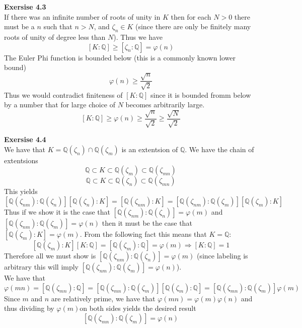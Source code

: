 \documentclass[12pt]{article}
\newenvironment{ques}[1]{\textbf{Exersise #1}\vspace{1 mm}\\ }{\bigskip}
\theoremstyle{definition}
\newcommand{\Q}{\mathbb Q}
\begin{document}
\begin{ques}{4.3}
	If there was an infinite number of roots of unity in $K$ then for each $N >
	0$ there must be a $n$ such that $n > N$, and $\zeta_n \in K$ (since there
	are only be finitely many roots of unity of degree less than $N$). Thus we have
	$$[K:\Q] \geq [\zeta_n:\Q] = \varphi(n)$$
	The Euler Phi function is bounded below (this is a commonly known lower bound)
	$$\varphi(n) \geq \frac{\sqrt n }{\sqrt 2}$$
	Thus we would contradict finiteness of $[K:\Q]$ since it is bounded fromm
	below by a number that for large choice of $N$ becomes arbitrarily large.
	$$[K:\Q] \geq \varphi(n) \geq \frac{\sqrt{n}}{\sqrt 2}
	\geq\frac{\sqrt{N}}{\sqrt 2}$$
\end{ques}

\begin{ques}{4.4}
	We have that $K = \Q(\zeta_n) \cap \Q(\zeta_m)$ is an extentsion of $\Q$.
	We have the chain of extentsions 
	$$\Q \subset K \subset \Q(\zeta_m) \subset
	\Q(\zeta_{m n})$$
	$$\Q \subset K \subset \Q(\zeta_n) \subset
	\Q(\zeta_{m n})$$
	This yields
	$$[\Q(\zeta_{n m}): \Q(\zeta_n)][\Q(\zeta_n) : K] = [\Q(\zeta_{n
	m}): K] = [\Q(\zeta_{n m}): \Q(\zeta_m)][\Q(\zeta_m) : K]$$
	Thus if we show it is the case that $[\Q(\zeta_{n m}): \Q(\zeta_n)] =
	\varphi(m)$ and $[\Q(\zeta_{n m}): \Q(\zeta_m)] = \varphi(n)$ then it
	must be the case that $[\Q(\zeta_m) : K] = \varphi(m)$. From the following
	fact this means that $K = \Q$:
	$$[\Q(\zeta_m) : K][K : \Q] = [\Q(\zeta_m):\Q] = \varphi(m) \Rightarrow [K:\Q] = 1$$
	Therefore all we must show is $[\Q(\zeta_{n m}): \Q(\zeta_n)] =
	\varphi(m)$ (since labeling is arbitrary this will imply $[\Q(\zeta_{n
	m}): \Q(\zeta_m)] = \varphi(n)$).\\
	We have that
	$$\varphi(mn) = [\Q(\zeta_{mn}): \Q] = [\Q(\zeta_{mn}):
	\Q(\zeta_m)][\Q(\zeta_m):\Q] = [\Q(\zeta_{mn}):
	\Q(\zeta_m)]\varphi(m)$$
	Since $m$ and $n$ are relatively prime, we have that $\varphi(mn) =
	\varphi(m)\varphi(n)$ and thus dividing by $\varphi(m)$on both sides yields
	the desired result
	$$[\Q(\zeta_{mn}): \Q(\zeta_m)] = \varphi(n)$$
\end{ques}
\end{document}
